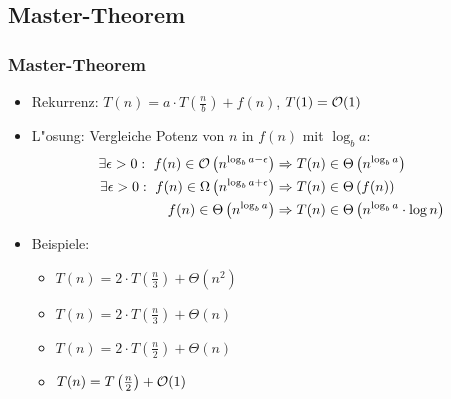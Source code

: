 \subsection{Master-Theorem}
\begin{frame}
  \frametitle{Master-Theorem}
  \begin{itemize}
  \item Rekurrenz: $T(n) = a\cdot T\left(\frac{n}{b}\right) + f(n)$, $T(1) = \mathcal{O}(1)$
  \item L"osung: Vergleiche Potenz von $n$ in $f(n)$ mit $\log_b a$:
    \begin{align*}
      \exists\epsilon > 0: \ f(n) \in \mathcal{O}\left(n^{\log_b a - \epsilon}\right) &\Rightarrow
             T(n) \in \Theta\left(n^{\log_ba}\right) \\
      \exists\epsilon > 0: \ f(n) \in \Omega\left(n^{\log_b a + \epsilon}\right) &\Rightarrow
             T(n) \in \Theta\left(f(n)\right) \\
      f(n) \in \Theta\left(n^{\log_b a}\right) &\Rightarrow
             T(n) \in \Theta\left(n^{\log_b a} \cdot \log n\right)
    \end{align*}
  \item Beispiele:
    \begin{itemize} \itemsep 1em
    \item $T(n) = 2\cdot T\left(\frac{n}{3}\right) + \Theta(n^2)$
    \item $T(n) = 2\cdot T\left(\frac{n}{3}\right) + \Theta(n)$
    \item $T(n) = 2\cdot T\left(\frac{n}{2}\right) + \Theta(n)$
    \item $T(n) = T\left(\frac{n}{2}\right) + \mathcal{O}(1)$
    \end{itemize}
  \end{itemize}
\end{frame}


